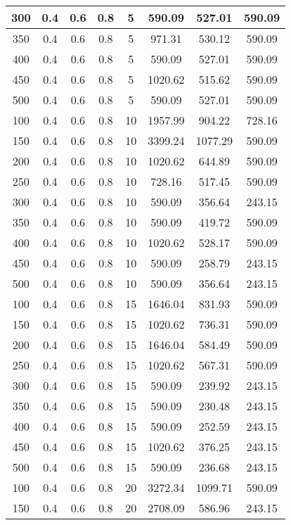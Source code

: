 \documentclass[a4paper, 12pt]{extreport}
\begin{document}
\begin{itemize}
\begin{longtable}{|c|c|c|c|c|c|c|c|}
			300 & 0.4 & 0.6 & 0.8 & 5 & 590.09 & 527.01 & 590.09 \\\hline
			350 & 0.4 & 0.6 & 0.8 & 5 & 971.31 & 530.12 & 590.09 \\\hline
			400 & 0.4 & 0.6 & 0.8 & 5 & 590.09 & 527.01 & 590.09 \\\hline
			450 & 0.4 & 0.6 & 0.8 & 5 & 1020.62 & 515.62 & 590.09 \\\hline
			500 & 0.4 & 0.6 & 0.8 & 5 & 590.09 & 527.01 & 590.09 \\\hline
			100 & 0.4 & 0.6 & 0.8 & 10 & 1957.99 & 904.22 & 728.16 \\\hline
			150 & 0.4 & 0.6 & 0.8 & 10 & 3399.24 & 1077.29 & 590.09 \\\hline
			200 & 0.4 & 0.6 & 0.8 & 10 & 1020.62 & 644.89 & 590.09 \\\hline
			250 & 0.4 & 0.6 & 0.8 & 10 & 728.16 & 517.45 & 590.09 \\\hline
			300 & 0.4 & 0.6 & 0.8 & 10 & 590.09 & 356.64 & 243.15 \\\hline
			350 & 0.4 & 0.6 & 0.8 & 10 & 590.09 & 419.72 & 590.09 \\\hline
			400 & 0.4 & 0.6 & 0.8 & 10 & 1020.62 & 528.17 & 590.09 \\\hline
			450 & 0.4 & 0.6 & 0.8 & 10 & 590.09 & 258.79 & 243.15 \\\hline
			500 & 0.4 & 0.6 & 0.8 & 10 & 590.09 & 356.64 & 243.15 \\\hline
			100 & 0.4 & 0.6 & 0.8 & 15 & 1646.04 & 831.93 & 590.09 \\\hline
			150 & 0.4 & 0.6 & 0.8 & 15 & 1020.62 & 736.31 & 590.09 \\\hline
			200 & 0.4 & 0.6 & 0.8 & 15 & 1646.04 & 584.49 & 590.09 \\\hline
			250 & 0.4 & 0.6 & 0.8 & 15 & 1020.62 & 567.31 & 590.09 \\\hline
			300 & 0.4 & 0.6 & 0.8 & 15 & 590.09 & 239.92 & 243.15 \\\hline
			350 & 0.4 & 0.6 & 0.8 & 15 & 590.09 & 230.48 & 243.15 \\\hline
			400 & 0.4 & 0.6 & 0.8 & 15 & 590.09 & 252.59 & 243.15 \\\hline
			450 & 0.4 & 0.6 & 0.8 & 15 & 1020.62 & 376.25 & 243.15 \\\hline
			500 & 0.4 & 0.6 & 0.8 & 15 & 590.09 & 236.68 & 243.15 \\\hline
			100 & 0.4 & 0.6 & 0.8 & 20 & 3272.34 & 1099.71 & 590.09 \\\hline
			150 & 0.4 & 0.6 & 0.8 & 20 & 2708.09 & 586.96 & 243.15 \\\hline

\end{longtable}
\end{itemize}
\end{document}

